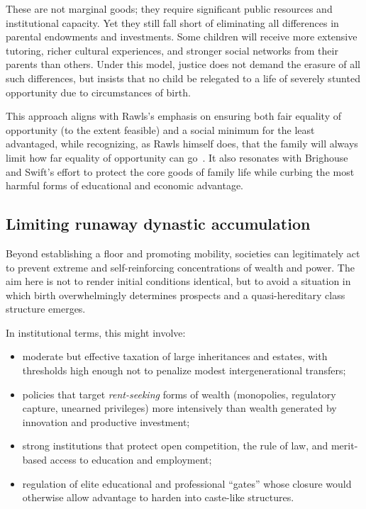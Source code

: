 \documentclass[%
  reprint,
  superscriptaddress,
  amsmath,amssymb,
  pra,
  floatfix,
  longbibliography
]{revtex4-2}
\begin{document}
These are not marginal goods; they require significant public resources
and institutional capacity.  Yet they still fall short of eliminating
all differences in parental endowments and investments.  Some children
will receive more extensive tutoring, richer cultural experiences, and
stronger social networks from their parents than others.  Under this
model, justice does not demand the erasure of all such differences, but
insists that no child be relegated to a life of severely stunted
opportunity due to circumstances of birth.

This approach aligns with Rawls's emphasis on ensuring both fair
equality of opportunity (to the extent feasible) and a social minimum
for the least advantaged, while recognizing, as Rawls himself does,
that the family will always limit how far equality of opportunity can
go~\cite{Rawls1999}.  It also resonates with Brighouse and Swift's
effort to protect the core goods of family life while curbing the most
harmful forms of educational and economic advantage.

\subsection{Limiting runaway dynastic accumulation}

Beyond establishing a floor and promoting mobility, societies can
legitimately act to prevent extreme and self-reinforcing concentrations
of wealth and power.  The aim here is not to render initial conditions
identical, but to avoid a situation in which birth overwhelmingly
determines prospects and a quasi-hereditary class structure emerges.

In institutional terms, this might involve:
\begin{itemize}
  \item moderate but effective taxation of large inheritances and
  estates, with thresholds high enough not to penalize modest
  intergenerational transfers;
  \item policies that target \emph{rent-seeking} forms of wealth
  (monopolies, regulatory capture, unearned privileges) more intensively
  than wealth generated by innovation and productive investment;
  \item strong institutions that protect open competition, the rule of
  law, and merit-based access to education and employment;
  \item regulation of elite educational and professional ``gates''
  whose closure would otherwise allow advantage to harden into
  caste-like structures.
\end{itemize}
\end{document}
